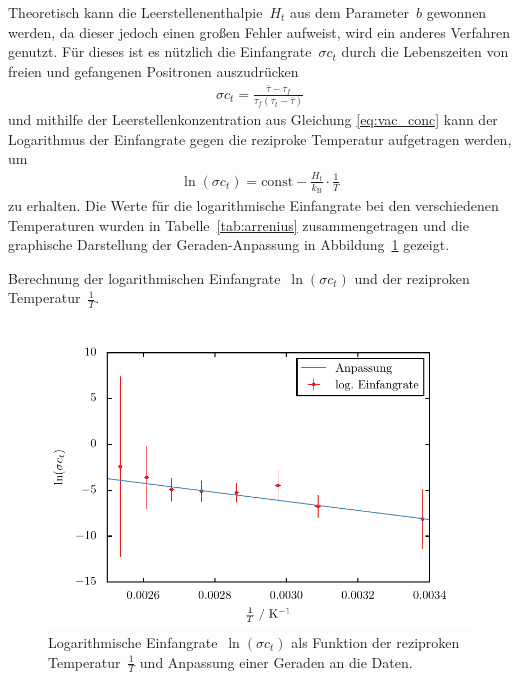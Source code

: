 \documentclass[11pt, a4paper]{article}
\numberwithin{equation}{section}
\begin{document}
Theoretisch kann die Leerstellenenthalpie~$H_t$ aus dem Parameter~$b$ gewonnen werden, da dieser jedoch einen großen Fehler aufweist, wird ein anderes Verfahren genutzt.
Für dieses ist es nützlich die Einfangrate~$\sigma c_t$ durch die Lebenszeiten von freien und gefangenen Positronen auszudrücken \cite{add_infos}
\begin{align*}
	\sigma c_t = \frac{\bar{\tau} - \tau_f}{\tau_f (\tau_t - \bar{\tau})}
\end{align*}
und mithilfe der Leerstellenkonzentration aus Gleichung \eqref{eq:vac_conc} kann der Logarithmus der Einfangrate gegen die reziproke Temperatur aufgetragen werden, um
\begin{align}
	\ln(\sigma c_t) = \mathrm{const} - \frac{H_t}{k_\mathrm{B}} \cdot \frac{1}{T} \label{eq:logogogogo}
\end{align}
zu erhalten.
Die Werte für die logarithmische Einfangrate bei den verschiedenen Temperaturen wurden in Tabelle~\ref{tab:arrenius} zusammengetragen und die graphische Darstellung der Geraden-Anpassung in Abbildung~\ref{fig:arrenius} gezeigt.
\begin{table}[h]
	\centering
	
	\caption{Berechnung der logarithmischen Einfangrate~$\ln(\sigma c_t)$ und der reziproken Temperatur~$\frac{1}{T}$.}
	\label{tab:arrenius}
\end{table}
\begin{figure}[h]
	\centering
	\includegraphics{./figures/arrenius.pdf}
	\caption{Logarithmische Einfangrate~$\ln(\sigma c_t)$ als Funktion der reziproken Temperatur~$\frac{1}{T}$ und Anpassung einer Geraden an die Daten.}
	\label{fig:arrenius}
\end{figure}
\end{document}
